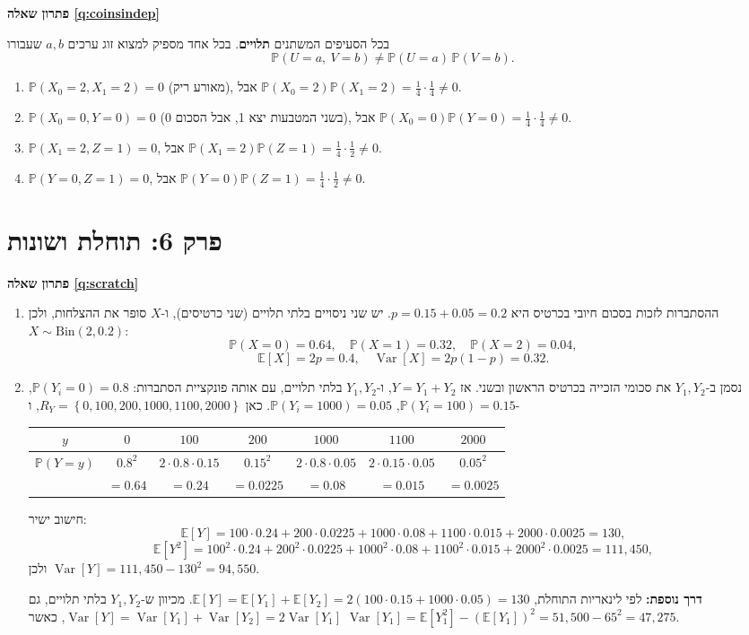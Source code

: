 \documentclass[11pt,a4paper]{report}
\newcommand{\flag}{\tikz[baseline=-0.1ex,x=0.9ex,y=0.9ex]{\draw[line width=0.5pt] (0,-0.3)--(0,1.6); \fill (0,1.6)--(1.2,1.2)--(0,0.8)--cycle;}}
\newcounter{todo}
\newcommand{\addtodo}[1]{\refstepcounter{todo}%
  \addcontentsline{tdo}{todo}{\protect\numberline{\thetodo}#1}}
\newcommand{\needcheck}[1]{\addtodo{#1}%
  {\color{todoc}\sffamily\small\,[\textbf{\flag{}\,\thetodo\ לבדיקה:} #1]\,}}
\renewcommand{\needcheck}[1]{}
\newcommand{\set}[1]{\left\{#1\right\}}
\newcommand{\PP}{\mathbb{P}}
\newcommand{\E}{\mathbb{E}}
\DeclareMathOperator{\Var}{Var}
\newcommand{\Bin}{\mathrm{Bin}}
\newenvironment{solution}[1]{\par\bigskip\noindent
  {\sffamily\bfseries\color{thmc}פתרון שאלה \ref{q:#1}}\par\nopagebreak\smallskip}%
  {\par\medskip\noindent{\color{exc!50}\rule{\linewidth}{0.4pt}}\par}
\newcommand{\ans}[1]{\boxed{#1}}
\begin{document}
\begin{solution}{coinsindep}
בכל הסעיפים המשתנים \textbf{תלויים}. בכל אחד מספיק למצוא זוג ערכים $a,b$ שעבורו
\[
  \PP(U=a,\ V=b)\neq\PP(U=a)\,\PP(V=b).
\]
\begin{enumerate}[label=(\alph*)]
  \item $\PP(X_0=2,X_1=2)=0$ (מאורע ריק), אבל $\PP(X_0=2)\PP(X_1=2)=\frac14\cdot\frac14\neq0$.
  \item $\PP(X_0=0,Y=0)=0$ (בשני המטבעות יצא 1, אבל הסכום 0), אבל $\PP(X_0=0)\PP(Y=0)=\frac14\cdot\frac14\neq0$.
  \item $\PP(X_1=2,Z=1)=0$, אבל $\PP(X_1=2)\PP(Z=1)=\frac14\cdot\frac12\neq0$.
  \item $\PP(Y=0,Z=1)=0$, אבל $\PP(Y=0)\PP(Z=1)=\frac14\cdot\frac12\neq0$.
\end{enumerate}
\end{solution}

\section*{פרק 6: תוחלת ושונות}

\begin{solution}{scratch}
\begin{enumerate}[label=(\alph*)]
  \item ההסתברות לזכות בסכום חיובי בכרטיס היא $p=0.15+0.05=0.2$. יש שני ניסויים בלתי תלויים (שני כרטיסים), ו-$X$ סופר את ההצלחות, ולכן $X\sim\Bin(2,0.2)$:
  \[
    \PP(X=0)=0.64,\quad \PP(X=1)=0.32,\quad \PP(X=2)=0.04,
  \]
  \[
    \E[X]=2p=\ans{0.4},\quad \Var[X]=2p(1-p)=\ans{0.32}.
  \]
  \item נסמן ב-$Y_1,Y_2$ את סכומי הזכייה בכרטיס הראשון ובשני. אז $Y=Y_1+Y_2$, ו-$Y_1,Y_2$ בלתי תלויים, עם אותה פונקציית הסתברות:
  $\PP(Y_i=0)=0.8$, $\PP(Y_i=100)=0.15$, $\PP(Y_i=1000)=0.05$.
  כאן $R_Y=\set{0,100,200,1000,1100,2000}$, ו-
  \begin{center}
  \renewcommand{\arraystretch}{1.3}
  \begin{tabular}{c|cccccc}
    $y$ & $0$ & $100$ & $200$ & $1000$ & $1100$ & $2000$\\ \hline
    $\PP(Y=y)$ & $0.8^2$ & $2\cdot0.8\cdot0.15$ & $0.15^2$ & $2\cdot0.8\cdot0.05$ & $2\cdot0.15\cdot0.05$ & $0.05^2$\\
    & $=0.64$ & $=0.24$ & $=0.0225$ & $=0.08$ & $=0.015$ & $=0.0025$
  \end{tabular}
  \end{center}
  חישוב ישיר:
  \[
    \E[Y]=100\cdot0.24+200\cdot0.0225+1000\cdot0.08+1100\cdot0.015+2000\cdot0.0025=\ans{130},
  \]
  \[
    \E[Y^2]=100^2\cdot0.24+200^2\cdot0.0225+1000^2\cdot0.08+1100^2\cdot0.015+2000^2\cdot0.0025=111{,}450,
  \]
  ולכן $\Var[Y]=111{,}450-130^2=\ans{94{,}550}$.

  \textbf{דרך נוספת:} לפי לינאריות התוחלת, $\E[Y]=\E[Y_1]+\E[Y_2]=2(100\cdot0.15+1000\cdot0.05)=130$. מכיוון ש-$Y_1,Y_2$ בלתי תלויים, גם $\Var[Y]=\Var[Y_1]+\Var[Y_2]=2\Var[Y_1]$, כאשר
  $\Var[Y_1]=\E[Y_1^2]-(\E[Y_1])^2=51{,}500-65^2=47{,}275$.
  \needcheck{בדף הפתרונות הדרך השנייה לא הושלמה ($\Var[Y_1]$ לא חושבה); השלמתי}
\end{enumerate}
\end{solution}
\end{document}
